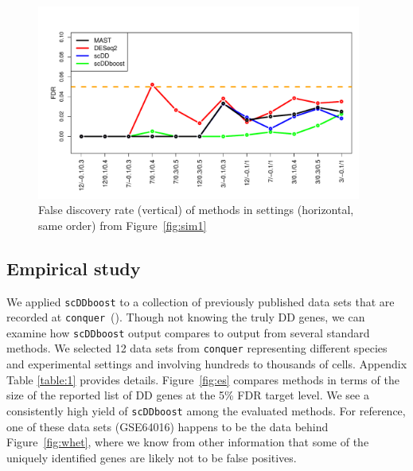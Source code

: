 \documentclass[aoas,preprint]{imsart}
\begin{document}
\begin{figure}[H]
  \includegraphics[width = 0.95\textwidth]{Figs/simuFDR.pdf}
  \caption{False discovery rate (vertical) of methods in settings (horizontal, same order) from Figure~\ref{fig:sim1} }
  \label{fig:sim2}
\end{figure}


\subsection{Empirical study}

We applied \verb+scDDboost+ to a collection of previously published
data sets that are recorded at \verb+conquer+~(\cite{ref:Cq}).  
Though not knowing the truly DD
genes, we can examine how \verb+scDDboost+ output compares to output from several standard methods.  We selected
12 data sets from \verb+conquer+   representing different species and experimental settings
and involving hundreds to thousands of cells.   Appendix Table \ref{table:1} provides details.  Figure~\ref{fig:es} compares
methods in terms of the size of the reported list of DD genes at the 5\% FDR target level.  
We see a consistently high yield of \verb+scDDboost+ among the evaluated  methods.  For reference, one of these data 
sets (GSE64016) happens to be the data behind Figure~\ref{fig:whet}, where we know from other information that some
of the uniquely identified genes are likely not to be false positives.
\end{document}
